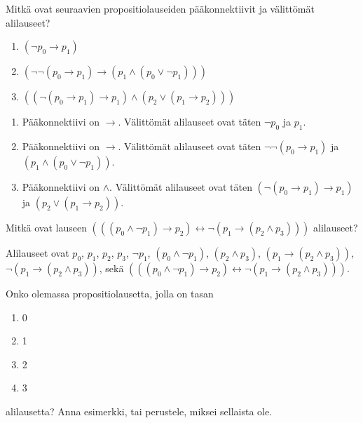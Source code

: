 \documentclass[12pt,a4paper]{article}
\begin{document}
\begin{exercise}
Mitkä ovat seuraavien propositiolauseiden pääkonnektiivit ja välittömät
alilauseet?
\begin{enumerate}[label=\alph*), nosep]
\item \((\neg p_0 \rightarrow p_1)\)
\item \((\neg \neg (p_0 \rightarrow p_1) \rightarrow (p_1 \land (p_0
\lor \neg p_1)))\)
\item \(((\neg(p_0 \rightarrow p_1) \rightarrow p_1) \land (p_2 \lor
(p_1 \rightarrow p_2)))\)
\end{enumerate}
\end{exercise}

\begin{solution}
\leavevmode\par
\begin{enumerate}[label=\alph*), nosep]
\item Pääkonnektiivi on \(\rightarrow\). Välittömät alilauseet ovat täten
\(\neg p_0\) ja \(p_1\).
\item Pääkonnektiivi on \(\rightarrow\). Välittömät alilauseet ovat täten
\(\neg \neg(p_0 \rightarrow p_1)\) ja \((p_1 \land (p_0 \lor \neg p_1))\).
\item Pääkonnektiivi on \(\land\). Välittömät alilauseet ovat täten
\((\neg(p_0 \rightarrow p_1) \rightarrow p_1)\) ja
\((p_2 \lor (p_1 \rightarrow p_2))\).
\end{enumerate}
\end{solution}

\begin{exercise}
Mitkä ovat lauseen
\((((p_0 \land \neg p_1) \rightarrow p_2) \leftrightarrow \neg(p_1
\rightarrow (p_2 \land p_3)))\)
alilauseet?
\end{exercise}

\begin{solution}
Alilauseet ovat \(p_0\), \(p_1\), \(p_2\), \(p_3\), \(\neg p_1\),
\((p_0 \land \neg p_1)\), \((p_2 \land p_3)\), \((p_1 \rightarrow
(p_2 \land p_3))\), \(\neg(p_1 \rightarrow (p_2 \land p_3))\),
sekä \((((p_0 \land \neg p_1) \rightarrow p_2) \leftrightarrow \neg(p_1
\rightarrow (p_2 \land p_3)))\).
\end{solution}

\begin{exercise}
Onko olemassa propositiolausetta, jolla on tasan
\begin{enumerate}[label=\alph*), nosep]
\item 0
\item 1
\item 2
\item 3
\end{enumerate}
alilausetta? Anna esimerkki, tai perustele, miksei sellaista ole.
\end{exercise}
\end{document}
